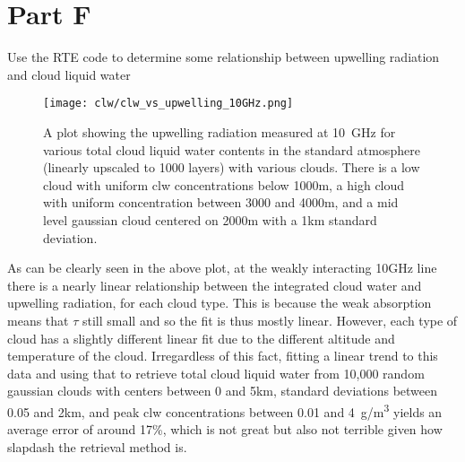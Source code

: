 \documentclass{article}
\begin{document}
\section*{Part F}
Use the RTE code to determine some relationship between upwelling radiation and cloud liquid water
\begin{figure}[H]
    \texttt{[image: clw/clw\_vs\_upwelling\_10GHz.png]}
    \caption{A plot showing the upwelling radiation measured at \qty{10}{GHz} for various total cloud liquid water contents in the standard atmosphere (linearly upscaled to 1000 layers) with various clouds. There is a low cloud with uniform clw concentrations below 1000m, a high cloud with uniform concentration between 3000 and 4000m, and a mid level gaussian cloud centered on 2000m with a 1km standard deviation.}
\end{figure}

As can be clearly seen in the above plot, at the weakly interacting 10GHz line there is a nearly linear relationship between the integrated cloud water and upwelling radiation, for each cloud type. This is because the weak absorption means that $\tau$ still small and so the fit is thus mostly linear. However, each type of cloud has a slightly different linear fit due to the different altitude and temperature of the cloud. Irregardless of this fact, fitting a linear trend to this data and using that to retrieve total cloud liquid water from 10,000 random gaussian clouds with centers between 0 and 5km, standard deviations between 0.05 and 2km, and peak clw concentrations between 0.01 and \qty{4}{g/m^3} yields an average error of around 17\%, which is not great but also not terrible given how slapdash the retrieval method is.
\end{document}
